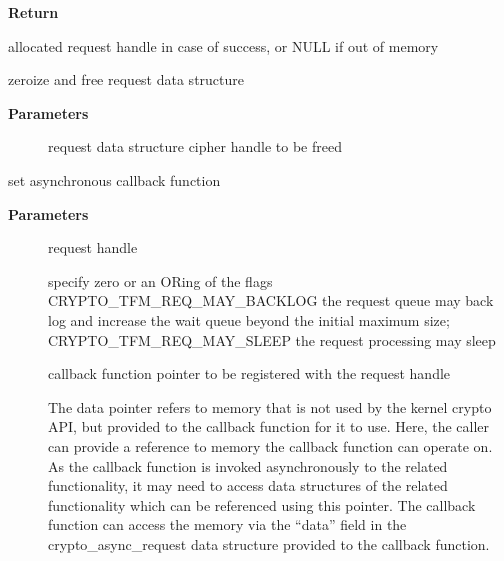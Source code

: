 \documentclass[a4paper,8pt,english]{sphinxmanual}
\begin{document}
\textbf{Return}

allocated request handle in case of success, or NULL if out of memory

\begin{fulllineitems}
\label{crypto/api-skcipher:c.ablkcipher_request_free}
zeroize and free request data structure

\end{fulllineitems}


\textbf{Parameters}
\begin{description}
\item[{}] \leavevmode
request data structure cipher handle to be freed

\end{description}

\begin{fulllineitems}
\label{crypto/api-skcipher:c.ablkcipher_request_set_callback}
set asynchronous callback function

\end{fulllineitems}


\textbf{Parameters}
\begin{description}
\item[{}] \leavevmode
request handle

\item[{}] \leavevmode
specify zero or an ORing of the flags
CRYPTO\_TFM\_REQ\_MAY\_BACKLOG the request queue may back log and
increase the wait queue beyond the initial maximum size;
CRYPTO\_TFM\_REQ\_MAY\_SLEEP the request processing may sleep

\item[{}] \leavevmode
callback function pointer to be registered with the request handle

\item[{}] \leavevmode
The data pointer refers to memory that is not used by the kernel
crypto API, but provided to the callback function for it to use. Here,
the caller can provide a reference to memory the callback function can
operate on. As the callback function is invoked asynchronously to the
related functionality, it may need to access data structures of the
related functionality which can be referenced using this pointer. The
callback function can access the memory via the ``data'' field in the
crypto\_async\_request data structure provided to the callback function.

\end{description}
\end{document}
